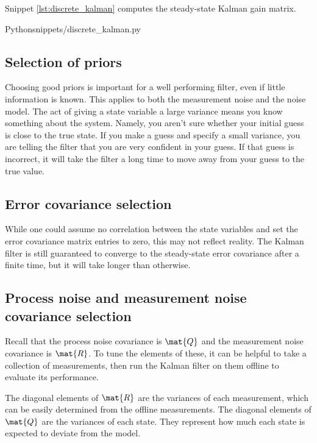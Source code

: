Snippet \ref{lst:discrete_kalman} computes the steady-state Kalman gain matrix.
\begin{coderemote}{Python}{snippets/discrete_kalman.py}
  \caption{Steady-state Kalman gain matrix calculation in Python}
  \label{lst:discrete_kalman}
\end{coderemote}

\subsection{Selection of priors}

Choosing good priors is important for a well performing filter, even if little
information is known. This applies to both the measurement noise and the noise
\gls{model}. The act of giving a \gls{state} variable a large variance means you
know something about the \gls{system}. Namely, you aren't sure whether your
initial guess is close to the true \gls{state}. If you make a guess and specify
a small variance, you are telling the filter that you are very confident in your
guess. If that guess is incorrect, it will take the filter a long time to move
away from your guess to the true value.

\subsection{Error covariance selection}

While one could assume no correlation between the \gls{state} variables and set
the error covariance matrix entries to zero, this may not reflect reality. The
Kalman filter is still guaranteed to converge to the steady-state error
covariance after a finite time, but it will take longer than otherwise.

\subsection{Process noise and measurement noise covariance selection}

Recall that the process noise covariance is $\mat{Q}$ and the measurement noise
covariance is $\mat{R}$. To tune the elements of these, it can be helpful to
take a collection of measurements, then run the Kalman filter on them offline to
evaluate its performance.

The diagonal elements of $\mat{R}$ are the variances of each measurement, which
can be easily determined from the offline measurements. The diagonal elements of
$\mat{Q}$ are the variances of each \gls{state}. They represent how much each
\gls{state} is expected to deviate from the \gls{model}.


